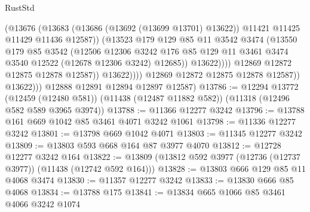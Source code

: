 \begin{lexlean}{RustStd}
\begin{coremodule}
                                  (@13676
                                    (@13683
                                      (@13686 (@13692 (@13699 @13701) @13622))
                                      @11421
                                      @11425
                                      @11429
                                      @11436
                                      @12587))
                                  (@13523
                                    @179
                                    @129
                                    @85
                                    @11
                                    @3542
                                    @3474
                                    (@13550
                                      @179
                                      @85
                                      @3542
                                      (@12506
                                        @12306
                                        @3242
                                        @176
                                        @85
                                        @129
                                        @11
                                        @3461
                                        @3474
                                        @3540
                                        @12522
                                        (@12678 @12306 @3242)
                                        @12685))
                                    @13622))))
                            @12869
                            @12872
                            @12875
                            @12878
                            @12587))
                        @13622))))
                @12869
                @12872
                @12875
                @12878
                @12587))
            @13622)))
      @12888
      @12891
      @12894
      @12897
      @12587)
@13786 := @12294
    @13772
    (@12459 (@12480 @581))
    (@11438 (@12487 @11882 @582))
    (@11318 (@12496 @582 @589 @3965 @3974))
@13788 := @11366 @12277 @3242
@13796 := @13788 @161 @669 @1042 @85 @3461 @4071 @3242 @1061
@13798 := @11336 @12277 @3242
@13801 := @13798 @669 @1042 @4071
@13803 := @11345 @12277 @3242
@13809 := @13803 @593 @668 @164 @87 @3977 @4070
@13812 := @12728 @12277 @3242 @164
@13822 := @13809 (@13812 @592 @3977 (@12736 (@12737 @3977)) (@11438 (@12742 @592 @164)))
@13828 := @13803 @666 @129 @85 @11 @4068 @3474
@13830 := @11357 @12277 @3242
@13833 := @13830 @666 @85 @4068
@13834 := @13788 @175
@13841 := @13834 @665 @1066 @85 @3461 @4066 @3242 @1074

\end{coremodule}
\end{lexlean}
